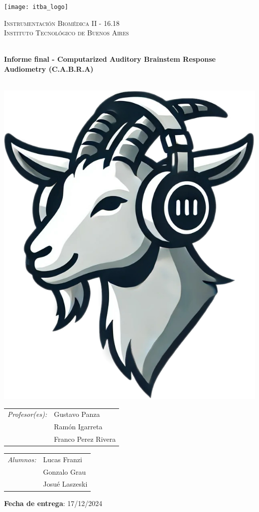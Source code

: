 \begin{center}

\texttt{[image: itba\_logo]}
\vspace{1cm}

\textsc{\LARGE Instrumentación Biomédica II - 16.18}\\[0.2cm]
\textsc{\Large Instituto Tecnológico de Buenos Aires}\\[0.2cm]
\vspace{1cm}

\HRule \\[0.2cm]
{ \huge \bfseries Informe final - Computarized Auditory Brainstem Response Audiometry (C.A.B.R.A) \\[0.2cm] }
\HRule \\[1cm]

\vspace{1cm}

\includegraphics[width=0.2\linewidth]{figuras/cabra_logo}


\vspace{1cm}
\begin{multicols}{2}

\begin{tabular}{l l}
  \emph{Profesor(es):}   &  Gustavo Panza \\
                         &  Ramón Igarreta \\
                         &  Franco Perez Rivera \\

\end{tabular}


\columnbreak

\begin{tabular}{l l}
  \emph{Alumnos:}   &  Lucas Franzi \\
                    &  Gonzalo Grau \\
                    &  Josué Laszeski \\
\end{tabular}

\end{multicols}
\vspace{1cm}

\textbf{Fecha de entrega}: 17/12/2024

\end{center}


\thispagestyle{empty}
\pagestyle{fancy}
\headheight=60pt 	%

\newpage